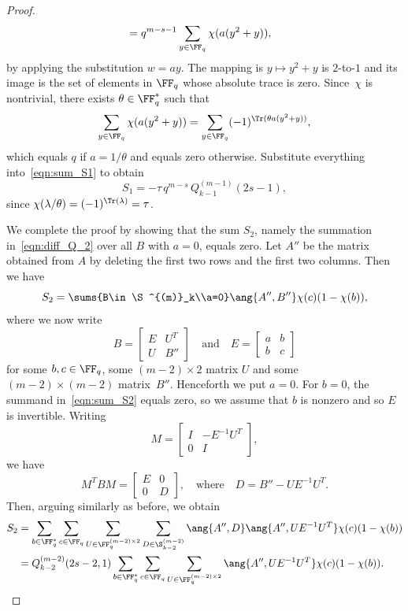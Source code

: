 \begin{proof}
\begin{align*}
&=q^{m-s-1}\sum_{y\in\FF_q}\chi(a(y^2+y)),
\end{align*}
by applying the substitution $w=ay$. The mapping is $y\mapsto y^2+y$ is $2$-to-$1$ and its image is the set of elements in $\FF_q$ whose absolute trace is zero. Since~$\chi$ is nontrivial, there exists $\theta\in\FF_q^*$ such that
\[
\sum_{y\in\FF_q}\chi(a(y^2+y))=\sum_{y\in\FF_q}(-1)^{\Tr(\theta a(y^2+y))},
\]
which equals $q$ if $a=1/\theta$ and equals zero otherwise. Substitute everything into~\eqref{eqn:sum_S1} to obtain
\[
S_1=-\tau\, q^{m-s}\,Q^{(m-1)}_{k-1}(2s-1),
\]
since $\chi(\lambda/\theta)=(-1)^{\Tr(\lambda)}=\tau$. 
\par
We complete the proof by showing that the sum $S_2$, namely the summation in~\eqref{eqn:diff_Q_2} over all $B$ with $a=0$, equals zero. Let $A''$ be the matrix obtained from $A$ by deleting the first two rows and the first two columns. Then we have
\begin{equation}
S_2=\sums{B\in\S^{(m)}_k\\a=0}\ang{A'',B''}\chi(c)(1-\chi(b)),   \label{eqn:sum_S2}
\end{equation}
where we now write
\[
B=\begin{bmatrix}
E & U^T\\
U & B''
\end{bmatrix}
\quad\text{and}\quad
E=\begin{bmatrix}
a & b\\
b & c
\end{bmatrix}
\]
for some $b,c\in\FF_q$, some $(m-2)\times 2$ matrix $U$ and some $(m-2)\times(m-2)$ matrix~$B''$. Henceforth we put $a=0$. For $b=0$, the summand in~\eqref{eqn:sum_S2} equals zero, so we assume that $b$ is nonzero and so $E$ is invertible. Writing 
\[
M=\begin{bmatrix}
I & -E^{-1}U^T\\
0 & I
\end{bmatrix},
\]
we have
\[
M^TBM=\begin{bmatrix}
E & 0\\
0 & D
\end{bmatrix},
\quad\text{where}\quad
D=B''-UE^{-1}U^T.
\]
Then, arguing similarly as before, we obtain
\begin{align*}
S_2&=\sum_{b\in\FF_q^*}\sum_{c\in\FF_q}\sum_{U\in\FF_q^{(m-2)\times 2}}\sum_{D\in\S^{(m-2)}_{k-2}}\ang{A'',D}\ang{A'',UE^{-1}U^T}\chi(c)(1-\chi(b))\\
&=Q^{(m-2)}_{k-2}(2s-2,1)\sum_{b\in\FF_q^*}\sum_{c\in\FF_q}\sum_{U\in\FF_q^{(m-2)\times 2}}\ang{A'',UE^{-1}U^T}\chi(c)(1-\chi(b)).

\end{align*}
\end{proof}
